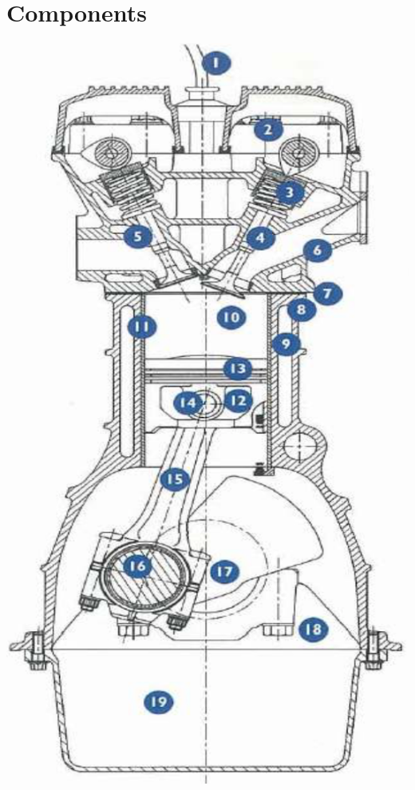 		\section{Components}
			\begin{center}
			\begin{minipage}{0.2\textwidth}			
			\includegraphics[scale=0.3]{ch1/10}
			\end{minipage}

\end{center}
